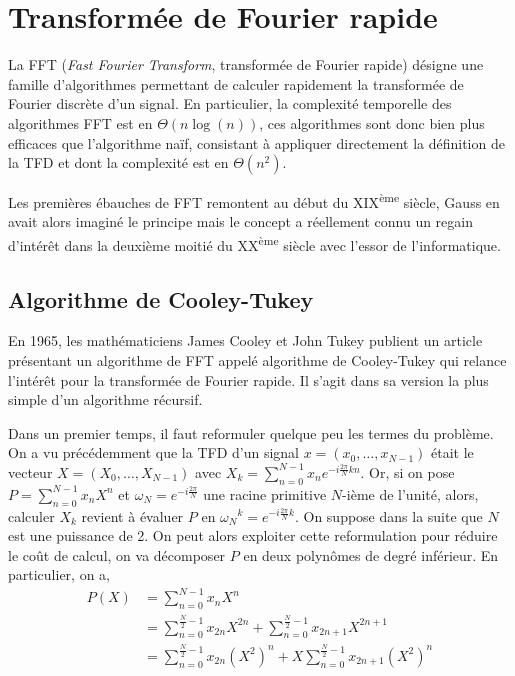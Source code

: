 \section{Transformée de Fourier rapide}

La FFT (\textit{Fast Fourier Transform}, transformée de Fourier rapide) désigne une famille d'algorithmes permettant de calculer \og rapidement \fg la transformée de Fourier discrète d'un signal. En particulier, la complexité temporelle des algorithmes FFT est en $\Theta \left(n \log \left( n \right) \right)$, ces algorithmes sont donc bien plus efficaces que l'algorithme naïf, consistant à appliquer directement la définition de la TFD et dont la complexité est en $\Theta\left( n^2 \right)$.

Les premières ébauches de FFT remontent au début du XIX\textsuperscript{ème} siècle, Gauss en avait alors imaginé le principe\cite{gauss-fft} mais le concept a réellement connu un regain d'intérêt dans la deuxième moitié du XX\textsuperscript{ème} siècle avec l'essor de l'informatique.

\subsection{Algorithme de Cooley-Tukey}
\label{section-cooley-tukey}

En 1965, les mathématiciens James Cooley et John Tukey publient un article présentant un algorithme de FFT appelé algorithme de Cooley-Tukey\cite{cooley-tukey-fft} qui relance l'intérêt pour la transformée de Fourier rapide. Il s'agit dans sa version la plus simple d'un algorithme récursif.

Dans un premier temps, il faut reformuler quelque peu les termes du problème\cite{algo-fft}. On a vu précédemment que la TFD d'un signal $x = \left( x_0, \dots, x_{N - 1} \right)$ était le vecteur $X = \left( X_0, \dots, X_{N-1} \right)$ avec $X_k = \sum_{n = 0}^{N - 1} x_n e^{-i \frac{2 \pi}{N} k n}$. Or, si on pose $P = \sum_{n=0}^{N - 1} x_n X^n$ et $\omega_N = e^{-i \frac{2 \pi}{N}}$ une racine primitive $N$-ième de l'unité, alors, calculer $X_k$ revient à évaluer $P$ en ${\omega_N}^k = e^{-i \frac{2 \pi}{N} k}$. On suppose dans la suite que $N$ est une puissance de 2.
On peut alors exploiter cette reformulation pour réduire le coût de calcul, on va décomposer $P$ en deux polynômes de degré inférieur. En particulier, on a,
\begin{align*}
P(X) &= \sum_{n=0}^{N-1} x_n X^n \\
&= \sum_{n=0}^{\frac{N}{2}-1} x_{2n} X^{2 n} + \sum_{n=0}^{\frac{N}{2}-1} x_{2 n + 1} X^{2 n + 1} \\
&= \sum_{n=0}^{\frac{N}{2}-1} x_{2 n} (X^2)^n + X \sum_{n=0}^{\frac{N}{2}-1} x_{2 n + 1} (X^2)^n
\end{align*}

